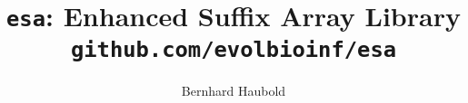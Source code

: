 \documentclass[a4paper]{article}
\begin{document}
\pagestyle{noweb}

\title{\texttt{esa}: Enhanced Suffix Array Library\\
\small \texttt{github.com/evolbioinf/esa}}
\author{Bernhard Haubold}
\maketitle
\tableofcontents




\end{document}
